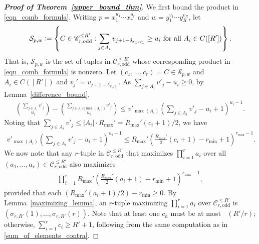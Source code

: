 \documentclass[11pt]{amsart}
\newcommand{\defeq}{\vcentcolon=}
\DeclareMathOperator{\oddleq}{\mathcal{O}_{\leq}}
\begin{document}
\begin{proof}[\textbf{Proof of Theorem~\ref{upper_bound_thm}}]
    We first bound the product in \eqref{eqn_comb_formula}. Writing $p=x_1^{u_1}\cdots x_r^{u_r}$ and $w=y_1^{v_1}\cdots y_{R}^{v_{R}}$, let 
    \begin{align*}
        \mathcal{S}_{p,w}\defeq\left\{C\in \mathscr{C}_{r,\text{odd}}^{\leq R'}:\sum_{j\in A_i}v_{j+1-\delta_{x_1,y_1}}\geq u_i \text{~for all~} A_i\in C([R'])\right\}.
    \end{align*}
    That is, $\mathcal{S}_{p,w}$ is the set of tuples in $\mathscr{C}_{r,\text{odd}}^{\leq R'}$ whose corresponding product in \eqref{eqn_comb_formula} is nonzero. Let $(c_1,\dots,c_r)=C\in\mathcal{S}_{p,w}$ and $A_i\in C([R'])$ and $v_j'=v_{j+1-\delta_{x_1,y_1}}$. As $\sum_{j\in A_i}v'_{j}-u_i\geq 0$, by Lemma~\ref{difference_bound},
    \begin{align}\label{usual_estimate}
        {\sum_{j\in A_i}v'_{j}\choose u_i}-{\sum_{j\in A_i\setminus\{\max(A_i)\}}v'_{j}\choose u_i}\leq v'_{\max(A_i)}\left(\sum_{j\in A_i}v'_{j}-u_i+1\right)^{u_i-1}.
    \end{align}
    Noting that $\sum_{j\in A_i}v'_{j}\leq |A_i|\cdot R_{\max}'= R_{\max}'(c_i+1)/2$, we have 
    \begin{align}\label{RHS_maxing}
        v'_{\max(A_i)}\left(\sum_{j\in A_i}v'_{j}-u_i+1\right)^{u_i-1}\leq R_{\max}'\left(\frac{R_{\max}'}{2}(c_i+1)-r_{\min}+1\right)^{r_{\max}-1}.
    \end{align}
    We now note that any $r$-tuple in $\mathscr{C}_{r,\text{odd}}^{\leq R'}$ that maximizes $\prod_{i=1}^{r}a_i$ over all $(a_1,\dots,a_r)\in\mathscr{C}_{r,\text{odd}}^{\leq R'}$ also maximizes
    \begin{align*}
        \prod_{i=1}^{r}R_{\max}'\left(\frac{R_{\max}'}{2}(a_i+1)-r_{\min}+1\right)^{r_{\max}-1},
    \end{align*}
    provided that each $(R_{\max}'(a_i+1)/2)-r_{\min}\geq0$. By Lemma~\ref{maximizing_lemma}, an $r$-tuple maximizing $\prod_{i=1}^{r}a_i$ over $\mathscr{C}_{r,\text{odd}}^{\leq R'}$ is $(\sigma_{r,R'}(1),\dots,\sigma_{r,R'}(r))$. Note that at least one $c_h$ must be at most $\oddleq(R'/r)$; otherwise, $\sum_{i=1}^{r}c_i\geq R'+1$, following from the same computation as in \eqref{sum_of_elements_contra}. 
    

\end{proof}
\end{document}
